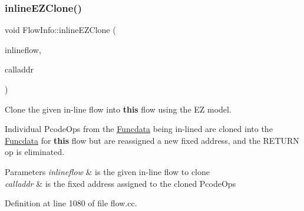 \subsubsection{\texorpdfstring{inlineEZClone()}{inlineEZClone()}}
{\footnotesize\ttfamily void Flow\+Info\+::inline\+E\+Z\+Clone (\begin{DoxyParamCaption}\item[{const \mbox{\hyperlink{class_flow_info}{Flow\+Info}} \&}]{inlineflow,  }\item[{const \mbox{\hyperlink{class_address}{Address}} \&}]{calladdr }\end{DoxyParamCaption})}



Clone the given in-\/line flow into {\bfseries{this}} flow using the EZ model. 

Individual Pcode\+Ops from the \mbox{\hyperlink{class_funcdata}{Funcdata}} being in-\/lined are cloned into the \mbox{\hyperlink{class_funcdata}{Funcdata}} for {\bfseries{this}} flow but are reassigned a new fixed address, and the R\+E\+T\+U\+RN op is eliminated. 
\begin{DoxyParams}{Parameters}
{\em inlineflow} & is the given in-\/line flow to clone \\
\hline
{\em calladdr} & is the fixed address assigned to the cloned Pcode\+Ops \\
\hline
\end{DoxyParams}


Definition at line 1080 of file flow.\+cc.


